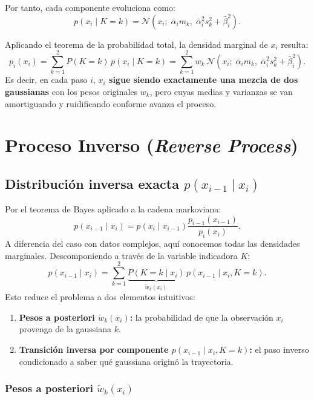 \documentclass[11pt,a4paper]{article}
\begin{document}
Por tanto, cada componente evoluciona como:
\[
p(x_i \mid K = k) = \mathcal{N}\left(x_i;\; \bar{\alpha}_i m_k,\; \bar{\alpha}_i^2 s_k^2 + \bar{\beta}_i^2\right).
\]

Aplicando el teorema de la probabilidad total, la densidad marginal de $x_i$ resulta:
\[
p_i(x_i) = \sum_{k=1}^2 P(K=k)\,p(x_i \mid K=k) = \sum_{k=1}^2 w_k\,\mathcal{N}\left(x_i;\; \bar{\alpha}_i m_k,\; \bar{\alpha}_i^2 s_k^2 + \bar{\beta}_i^2\right).
\]
Es decir, en cada paso $i$, \textbf{$x_i$ sigue siendo exactamente una mezcla de dos gaussianas} con los pesos originales $w_k$, pero cuyas medias y varianzas se van amortiguando y ruidificando conforme avanza el proceso.

\section{Proceso Inverso (\textit{Reverse Process})}

\subsection{Distribución inversa exacta $p(x_{i-1} \mid x_i)$}

Por el teorema de Bayes aplicado a la cadena markoviana:
\[
p(x_{i-1} \mid x_i) = p(x_i \mid x_{i-1}) \frac{p_{i-1}(x_{i-1})}{p_i(x_i)}.
\]
A diferencia del caso con datos complejos, aquí conocemos todas las densidades marginales. Descomponiendo a través de la variable indicadora $K$:
\[
p(x_{i-1} \mid x_i) = \sum_{k=1}^2 \underbrace{P(K = k \mid x_i)}_{\tilde{w}_k(x_i)} \, p(x_{i-1} \mid x_i, K = k).
\]
Esto reduce el problema a dos elementos intuitivos:
\begin{enumerate}
    \item \textbf{Pesos a posteriori $\tilde{w}_k(x_i)$:} la probabilidad de que la observación $x_i$ provenga de la gaussiana $k$.
    \item \textbf{Transición inversa por componente $p(x_{i-1} \mid x_i, K = k)$:} el paso inverso condicionado a saber qué gaussiana originó la trayectoria.
\end{enumerate}

\subsubsection{Pesos a posteriori $\tilde{w}_k(x_i)$}
\end{document}
